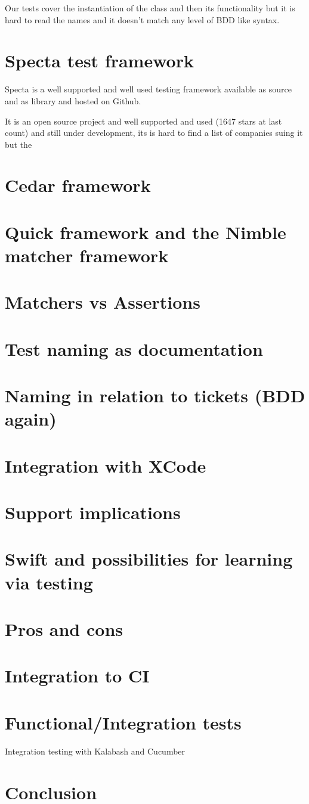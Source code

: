 \documentclass[a4paper, titlepage]{article}
\begin{document}
  Our tests cover the instantiation of the class and then its
  functionality but it is hard to read the names and it doesn't match any level of BDD like syntax.
  

















  \section{Specta test framework}
  Specta is a well supported and well used testing framework available
  as source and as library and hosted on Github.

  It is an open source project and well supported and used (1647 stars
  at last count) and still under development, its is hard to find a list
  of companies suing it but the 
\section{Cedar framework}
\section{Quick framework and the Nimble matcher framework}
\section{Matchers vs Assertions}
\section{Test naming as documentation}
\section{Naming in relation to tickets (BDD again)}
\section{Integration with XCode}
\section{Support implications}
  \section{Swift and possibilities for learning via testing}
\section{Pros and cons}
\section{Integration to CI}
\section{Functional/Integration tests}\label{sec:integration tests}
  Integration testing with Kalabash and Cucumber
\section{Conclusion}
  
\end{document}
